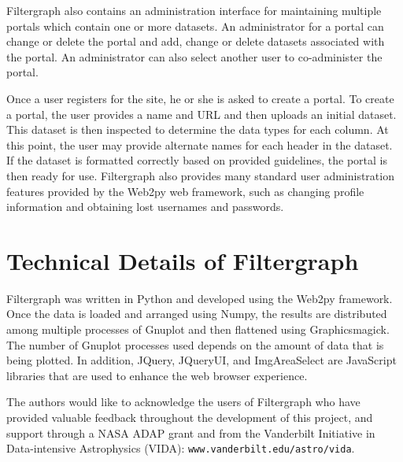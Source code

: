 Filtergraph also contains an administration interface for maintaining multiple portals which contain one or more datasets. An administrator for a portal can change or delete the portal and add, change or delete datasets associated with the portal. An administrator can also select another user to co-administer the portal.

Once a user registers for the site, he or she is asked to create a portal. To create a portal, the user provides a name and URL and then uploads an initial dataset. This dataset is then inspected to determine the data types for each column. At this point, the user may provide alternate names for each header in the dataset. If the dataset is formatted correctly based on provided guidelines, the portal is then ready for use. Filtergraph also provides many standard user administration features provided by the Web2py web framework, such as changing profile information and obtaining lost usernames and passwords.



\section{Technical Details of Filtergraph}
Filtergraph was written in Python and developed using the Web2py framework. Once the data is loaded and arranged using Numpy, the results are distributed among multiple processes of Gnuplot and then flattened using Graphicsmagick. The number of Gnuplot processes used depends on the amount of data that is being plotted. In addition, JQuery, JQueryUI, and ImgAreaSelect are JavaScript libraries that are used to enhance the web browser experience. 

\acknowledgements 
The authors would like to acknowledge the users of Filtergraph who have provided valuable feedback throughout the development of this project, and support  through a NASA ADAP grant and from the Vanderbilt Initiative in Data-intensive Astrophysics (VIDA): {\tt www.vanderbilt.edu/astro/vida}. 
